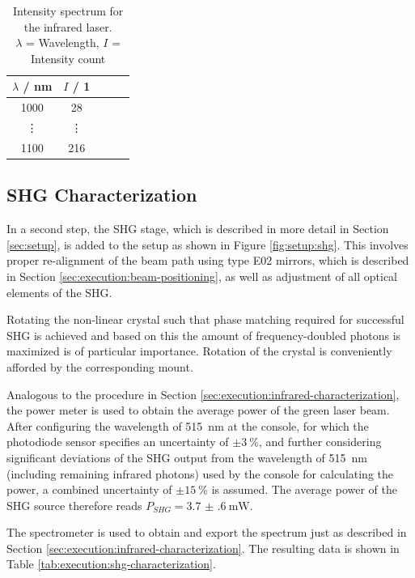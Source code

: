 \begin{table}[H]
    \centering
    \caption{Intensity spectrum for the infrared laser. \\
    $\lambda$ = Wavelength, $I$ = Intensity count}
    \label{tab:execution:infrared-characterization}
    \begin{tabular}{ccccc}
    \hline
    $\lambda$ / nm & $I$ / 1 \\ \hline
    1000  & 28  \\
    \vdots & \vdots  \\
    1100 & 216 \\ \hline
    \end{tabular}
\end{table}

\subsection{SHG Characterization}
\label{sec:execution:shg-characterization}

In a second step, the SHG stage, which is described in more detail in Section \ref{sec:setup}, is added to the setup as shown in Figure \ref{fig:setup:shg}. This involves proper re-alignment of the beam path using type E02 mirrors, which is described in Section \ref{sec:execution:beam-positioning}, as well as adjustment of all optical elements of the SHG. 

Rotating the non-linear crystal such that phase matching required for successful SHG is achieved and based on this the amount of frequency-doubled photons is maximized is of particular importance. Rotation of the crystal is conveniently afforded by the corresponding mount.

Analogous to the procedure in Section \ref{sec:execution:infrared-characterization}, the power meter is used to obtain the average power of the green laser beam. After configuring the wavelength of \SI{515}{\nm} at the console, for which the photodiode sensor specifies an uncertainty of $\pm \SI{3}{\percent}$, and further considering significant deviations of the SHG output from the wavelength of \SI{515}{\nm} (including remaining infrared photons) used by the console for calculating the power, a combined uncertainty of $\pm \SI{15}{\percent}$ is assumed. The average power of the SHG source therefore reads $P_{SHG} = \SI{3.7(6)}{\mW}$.

The spectrometer is used to obtain and export the spectrum just as described in Section \ref{sec:execution:infrared-characterization}. The resulting data is shown in Table \ref{tab:execution:shg-characterization}.

